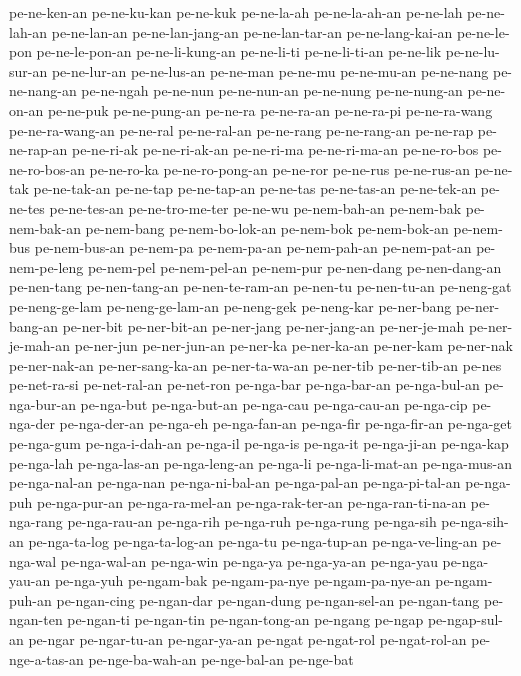 {pe-ne-ken-an pe-ne-ku-kan pe-ne-kuk pe-ne-la-ah pe-ne-la-ah-an pe-ne-lah
pe-ne-lah-an pe-ne-lan-an pe-ne-lan-jang-an pe-ne-lan-tar-an
pe-ne-lang-kai-an pe-ne-le-pon pe-ne-le-pon-an pe-ne-li-kung-an
pe-ne-li-ti pe-ne-li-ti-an pe-ne-lik pe-ne-lu-sur-an pe-ne-lur-an
pe-ne-lus-an pe-ne-man pe-ne-mu pe-ne-mu-an pe-ne-nang pe-ne-nang-an
pe-ne-ngah pe-ne-nun pe-ne-nun-an pe-ne-nung pe-ne-nung-an pe-ne-on-an
pe-ne-puk pe-ne-pung-an pe-ne-ra pe-ne-ra-an pe-ne-ra-pi pe-ne-ra-wang
pe-ne-ra-wang-an pe-ne-ral pe-ne-ral-an pe-ne-rang pe-ne-rang-an pe-ne-rap
pe-ne-rap-an pe-ne-ri-ak pe-ne-ri-ak-an pe-ne-ri-ma pe-ne-ri-ma-an
pe-ne-ro-bos pe-ne-ro-bos-an pe-ne-ro-ka pe-ne-ro-pong-an pe-ne-ror
pe-ne-rus pe-ne-rus-an pe-ne-tak pe-ne-tak-an pe-ne-tap pe-ne-tap-an
pe-ne-tas pe-ne-tas-an pe-ne-tek-an pe-ne-tes pe-ne-tes-an
pe-ne-tro-me-ter pe-ne-wu pe-nem-bah-an pe-nem-bak pe-nem-bak-an
pe-nem-bang pe-nem-bo-lok-an pe-nem-bok pe-nem-bok-an pe-nem-bus
pe-nem-bus-an pe-nem-pa pe-nem-pa-an pe-nem-pah-an pe-nem-pat-an
pe-nem-pe-leng pe-nem-pel pe-nem-pel-an pe-nem-pur pe-nen-dang
pe-nen-dang-an pe-nen-tang pe-nen-tang-an pe-nen-te-ram-an pe-nen-tu
pe-nen-tu-an pe-neng-gat pe-neng-ge-lam pe-neng-ge-lam-an pe-neng-gek
pe-neng-kar pe-ner-bang pe-ner-bang-an pe-ner-bit pe-ner-bit-an
pe-ner-jang pe-ner-jang-an pe-ner-je-mah pe-ner-je-mah-an pe-ner-jun
pe-ner-jun-an pe-ner-ka pe-ner-ka-an pe-ner-kam pe-ner-nak pe-ner-nak-an
pe-ner-sang-ka-an pe-ner-ta-wa-an pe-ner-tib pe-ner-tib-an pe-nes
pe-net-ra-si pe-net-ral-an pe-net-ron pe-nga-bar pe-nga-bar-an
pe-nga-bul-an pe-nga-bur-an pe-nga-but pe-nga-but-an pe-nga-cau
pe-nga-cau-an pe-nga-cip pe-nga-der pe-nga-der-an pe-nga-eh pe-nga-fan-an
pe-nga-fir pe-nga-fir-an pe-nga-get pe-nga-gum pe-nga-i-dah-an pe-nga-il
pe-nga-is pe-nga-it pe-nga-ji-an pe-nga-kap pe-nga-lah pe-nga-las-an
pe-nga-leng-an pe-nga-li pe-nga-li-mat-an pe-nga-mus-an pe-nga-nal-an
pe-nga-nan pe-nga-ni-bal-an pe-nga-pal-an pe-nga-pi-tal-an pe-nga-puh
pe-nga-pur-an pe-nga-ra-mel-an pe-nga-rak-ter-an pe-nga-ran-ti-na-an
pe-nga-rang pe-nga-rau-an pe-nga-rih pe-nga-ruh pe-nga-rung pe-nga-sih
pe-nga-sih-an pe-nga-ta-log pe-nga-ta-log-an pe-nga-tu pe-nga-tup-an
pe-nga-ve-ling-an pe-nga-wal pe-nga-wal-an pe-nga-win pe-nga-ya
pe-nga-ya-an pe-nga-yau pe-nga-yau-an pe-nga-yuh pe-ngam-bak
pe-ngam-pa-nye pe-ngam-pa-nye-an pe-ngam-puh-an pe-ngan-cing pe-ngan-dar
pe-ngan-dung pe-ngan-sel-an pe-ngan-tang pe-ngan-ten pe-ngan-ti
pe-ngan-tin pe-ngan-tong-an pe-ngang pe-ngap pe-ngap-sul-an pe-ngar
pe-ngar-tu-an pe-ngar-ya-an pe-ngat pe-ngat-rol pe-ngat-rol-an
pe-nge-a-tas-an pe-nge-ba-wah-an pe-nge-bal-an pe-nge-bat
}
